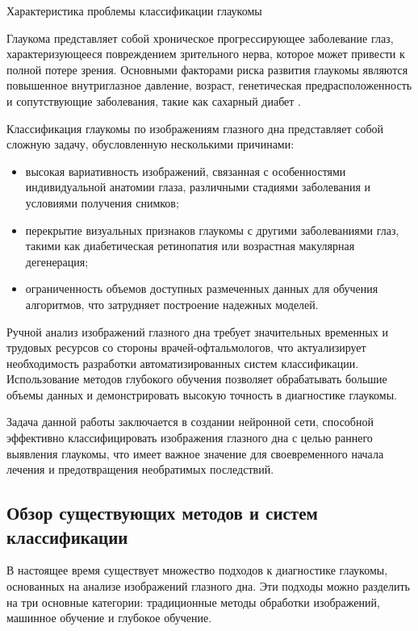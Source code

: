 {        {Характеристика проблемы классификации глаукомы}
    
        Глаукома представляет собой хроническое прогрессирующее заболевание глаз, характеризующееся повреждением зрительного нерва, которое может привести к полной потере зрения. Основными факторами риска развития глаукомы являются повышенное внутриглазное давление, возраст, генетическая предрасположенность и сопутствующие заболевания, такие как сахарный диабет \cite{glaucoma_review}.
        
        Классификация глаукомы по изображениям глазного дна представляет собой сложную задачу, обусловленную несколькими причинами:
        \begin{itemize}
            \item высокая вариативность изображений, связанная с особенностями индивидуальной анатомии глаза, различными стадиями заболевания и условиями получения снимков;
            \item перекрытие визуальных признаков глаукомы с другими заболеваниями глаз, такими как диабетическая ретинопатия или возрастная макулярная дегенерация;
            \item ограниченность объемов доступных размеченных данных для обучения алгоритмов, что затрудняет построение надежных моделей.
        \end{itemize}
        
        Ручной анализ изображений глазного дна требует значительных временных и трудовых ресурсов со стороны врачей-офтальмологов, что актуализирует необходимость разработки автоматизированных систем классификации. Использование методов глубокого обучения позволяет обрабатывать большие объемы данных и демонстрировать высокую точность в диагностике глаукомы.
        
        Задача данной работы заключается в создании нейронной сети, способной эффективно классифицировать изображения глазного дна с целью раннего выявления глаукомы, что имеет важное значение для своевременного начала лечения и предотвращения необратимых последствий.
        \vspace{13pt}
    \subsection{Обзор существующих методов и систем классификации}

    В настоящее время существует множество подходов к диагностике глаукомы, основанных на анализе изображений глазного дна. Эти подходы можно разделить на три основные категории: традиционные методы обработки изображений, машинное обучение и глубокое обучение.

}
